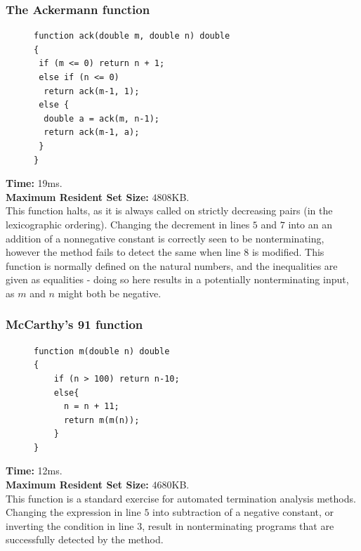 \documentclass[12pt,a4paper]{article}
\begin{document}
\subsubsection{The Ackermann function}\label{example:ack}
\begin{figure}
\centering
\begin{lstlisting}[frame=tlrb,language=myLang]
function ack(double m, double n) double
{
 if (m <= 0) return n + 1;
 else if (n <= 0) 
  return ack(m-1, 1);
 else {
  double a = ack(m, n-1);
  return ack(m-1, a);
 }
}
\end{lstlisting}
\end{figure}
\textbf{Time:} 19ms.\\ \textbf{Maximum Resident Set Size:} $4808$KB.\\
This function halts, as it is always called on strictly decreasing pairs (in the lexicographic ordering).
Changing the decrement in lines $5$ and $7$ into an an addition of a nonnegative constant is correctly seen to be nonterminating,
however the method fails to detect the same when line $8$ is modified.
This function is normally defined on the natural numbers, and the inequalities are given as equalities - doing so here results in a potentially
nonterminating input, as $m$ and $n$ might both be negative.

\newpage
\subsubsection{McCarthy's 91 function}
\begin{figure}
\centering
\begin{lstlisting}[frame=tlrb,language=myLang]
function m(double n) double
{
    if (n > 100) return n-10;
    else{
      n = n + 11;
      return m(m(n));
    }
}
\end{lstlisting}
\end{figure}
\textbf{Time:} 12ms.\\ \textbf{Maximum Resident Set Size:} $4680$KB.\\
This function is a standard exercise for automated termination analysis methods. Changing the expression in line $5$ into subtraction of a negative constant,
or inverting the condition in line $3$, result in nonterminating programs that are successfully detected by the method.
\vspace{.8cm}
\end{document}
